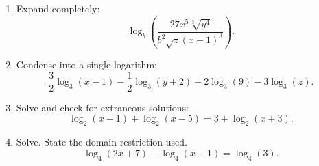 \documentclass[12pt]{article}
\begin{document}
\begin{enumerate}[leftmargin=*, itemsep=1.1em, topsep=0.8em]
  \item Expand completely:
  \[
  \log_b\!\left(\frac{27x^5\sqrt[3]{y^4}}{b^2\sqrt{z}(x-1)^3}\right).
  \]

  \item Condense into a single logarithm:
  \[
  \frac32\log_3(x-1)-\frac12\log_3(y+2)+2\log_3(9)-3\log_3(z).
  \]

  \item Solve and check for extraneous solutions:
  \[
  \log_2(x-1)+\log_2(x-5)=3+\log_2(x+3).
  \]

  \item Solve. State the domain restriction used.
  \[
  \log_4(2x+7)-\log_4(x-1)=\log_4(3).
  \]
\end{enumerate}
\end{document}
